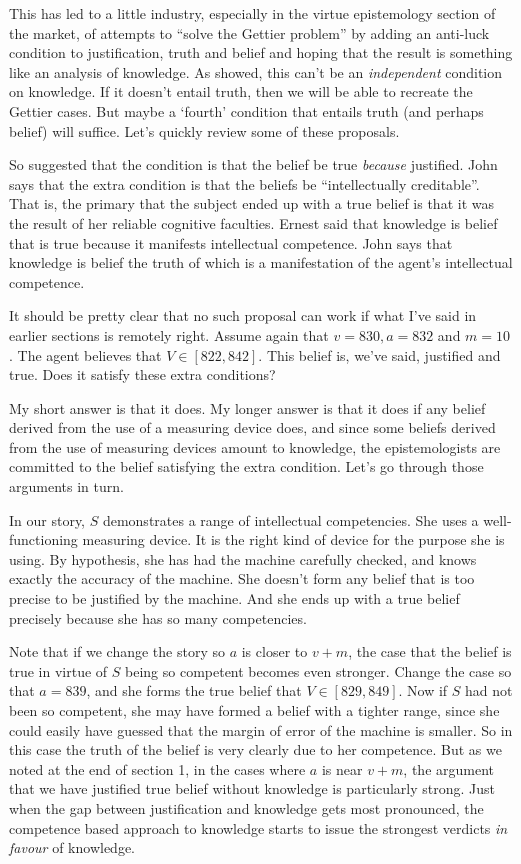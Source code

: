 This has led to a little industry, especially in the virtue epistemology section of the market, of attempts to ``solve the Gettier problem'' by adding an anti-luck condition to justification, truth and belief and hoping that the result is something like an analysis of knowledge. As  \citet{Zagzebski1994} showed, this can't be an \textit{independent} condition on knowledge. If it doesn't entail truth, then we will be able to recreate the Gettier cases. But maybe a `fourth' condition that entails truth (and perhaps belief) will suffice. Let's quickly review some of these proposals. 

So \citet{Zagzebski1996} suggested that the condition is that the belief be true \textit{because} justified. John \citet{Greco2010} says that the extra condition is that the beliefs be ``intellectually creditable''. That is, the primary that the subject ended up with a true belief is that it was the result of her reliable cognitive faculties. Ernest \citet{Sosa2007} said that knowledge is belief that is true because it manifests intellectual competence. John \citet{Turri2011} says that knowledge is belief the truth of which is a manifestation of the agent's intellectual competence.

It should be pretty clear that no such proposal can work if what I've said in earlier sections is remotely right. Assume again that $v = 830, a = 832$ and $m = 10$. The agent believes that $V \in [822, 842]$. This belief is, we've said, justified and true. Does it satisfy these extra conditions?

My short answer is that it does. My longer answer is that it does if any belief derived from the use of a measuring device does, and since some beliefs derived from the use of measuring devices amount to knowledge, the epistemologists are committed to the belief satisfying the extra condition. Let's go through those arguments in turn.

In our story, $S$ demonstrates a range of intellectual competencies. She uses a well-functioning measuring device. It is the right kind of device for the purpose she is using. By hypothesis, she has had the machine carefully checked, and knows exactly the accuracy of the machine. She doesn't form any belief that is too precise to be justified by the machine. And she ends up with a true belief precisely because she has so many competencies.

Note that if we change the story so $a$ is closer to $v + m$, the case that the belief is true in virtue of $S$ being so competent becomes even stronger. Change the case so that $a = 839$, and she forms the true belief that $V \in [829, 849]$. Now if $S$ had not been so competent, she may have formed a belief with a tighter range, since she could easily have guessed that the margin of error of the machine is smaller. So in this case the truth of the belief is very clearly due to her competence. But as we noted at the end of section 1, in the cases where $a$ is near $v + m$, the argument that we have justified true belief without knowledge is particularly strong. Just when the gap between justification and knowledge gets most pronounced, the competence based approach to knowledge starts to issue the strongest verdicts \textit{in favour} of knowledge.

